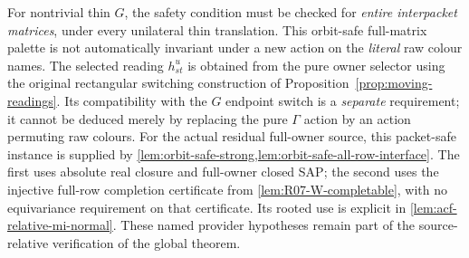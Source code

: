 \begin{remark}
\label{rem:safe-gauge-firewall}
For nontrivial thin $G$, the safety condition must be checked
for \emph{entire interpacket matrices}, under every unilateral
thin translation.  This orbit-safe full-matrix palette is
not automatically invariant under a new action on the
\emph{literal} raw colour names.  The selected reading
$h^u_{st}$ is obtained from the pure owner selector using the
original rectangular switching construction of
Proposition~\ref{prop:moving-readings}.  Its compatibility
with the $G$ endpoint switch is a \emph{separate}
requirement; it cannot be deduced merely by replacing the
pure $\Gamma$ action by an action permuting raw colours.
For the actual residual full-owner source, this packet-safe instance
is supplied by \cref{lem:orbit-safe-strong,lem:orbit-safe-all-row-interface}.
The first uses absolute real closure and full-owner closed SAP; the second
uses the injective full-row completion certificate from
\cref{lem:R07-W-completable}, with no equivariance requirement on that
certificate. Its rooted use is explicit in
\cref{lem:acf-relative-mi-normal}. These named provider hypotheses remain
part of the source-relative verification of the global theorem.
\end{remark}
